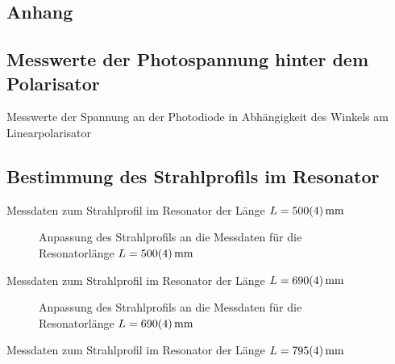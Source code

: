 \documentclass[11pt, a4paper]{article}
\numberwithin{equation}{section}
\begin{document}
\clearpage

\begin{appendix}
\section{Anhang}
\subsection{Messwerte der Photospannung hinter dem Polarisator}
\begin{table}[h]
	\centering
	
	\caption{Messwerte der Spannung an der Photodiode in Abhängigkeit des Winkels am Linearpolarisator}
	\label{tab:malus}
\end{table}
\clearpage

\subsection{Bestimmung des Strahlprofils im Resonator}
\label{app:strahlprofil}
\FloatBarrier
\begin{table}[ht]
	\centering
	
	\caption{Messdaten zum Strahlprofil im Resonator der Länge $L = \SI{500 +- 4}{\milli\metre}$}
	\label{tab:strahlradius_50}
\end{table}
\begin{figure}[hb]
	\centering
	
	\caption{Anpassung des Strahlprofils an die Messdaten für die Resonatorlänge $L = \SI{500 +- 4}{\milli\metre}$}
	\label{fig:strahlradius_50}
\end{figure}
\clearpage
\begin{table}[t]
	\centering
	
	\caption{Messdaten zum Strahlprofil im Resonator der Länge $L = \SI{690 +- 4}{\milli\metre}$}
	\label{tab:strahlradius_70}
\end{table}
\begin{figure}[b]
	\centering
	
	\caption{Anpassung des Strahlprofils an die Messdaten für die Resonatorlänge $L = \SI{690 +- 4}{\milli\metre}$}
	\label{fig:strahlradius_70}
\end{figure}
\clearpage
\begin{table}[t]
	\centering
	
	\caption{Messdaten zum Strahlprofil im Resonator der Länge $L = \SI{795 +- 4}{\milli\metre}$}
	\label{tab:strahlradius_80}
\end{table}

\end{appendix}
\end{document}
